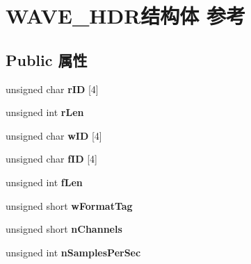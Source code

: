 \hypertarget{struct_w_a_v_e___h_d_r}{}\section{W\+A\+V\+E\+\_\+\+H\+D\+R结构体 参考}
\label{struct_w_a_v_e___h_d_r}
\subsection*{Public 属性}
\begin{DoxyCompactItemize}
\item 
\mbox{\label{struct_w_a_v_e___h_d_r_a72b07bba8ee1fb0f3c7967b8a38bbfe1}} 
unsigned char {\bfseries r\+ID} \mbox{[}4\mbox{]}
\item 
\mbox{\label{struct_w_a_v_e___h_d_r_af0fe5565deb514925f37b86a59c5f132}} 
unsigned int {\bfseries r\+Len}
\item 
\mbox{\label{struct_w_a_v_e___h_d_r_a310e90d8c6eb04d6454f6a7c0d16d6aa}} 
unsigned char {\bfseries w\+ID} \mbox{[}4\mbox{]}
\item 
\mbox{\label{struct_w_a_v_e___h_d_r_abbcad82ec8b5a56e0f24d8fd3ea8d643}} 
unsigned char {\bfseries f\+ID} \mbox{[}4\mbox{]}
\item 
\mbox{\label{struct_w_a_v_e___h_d_r_a7af243186e48fcc1d1f364e28de346fe}} 
unsigned int {\bfseries f\+Len}
\item 
\mbox{\label{struct_w_a_v_e___h_d_r_adbfae681ca60047be1500195fe0fa246}} 
unsigned short {\bfseries w\+Format\+Tag}
\item 
\mbox{\label{struct_w_a_v_e___h_d_r_a8f73b0bf0dfccdbf09972114454844d9}} 
unsigned short {\bfseries n\+Channels}
\item 
\mbox{\label{struct_w_a_v_e___h_d_r_a3a58c342bac0d7431b81ad914de6b377}} 
unsigned int {\bfseries n\+Samples\+Per\+Sec}
\item 
\mbox{\label{struct_w_a_v_e___h_d_r_aee35c074df36291121d152cd88e36f35}} 

\end{DoxyCompactItemize}
